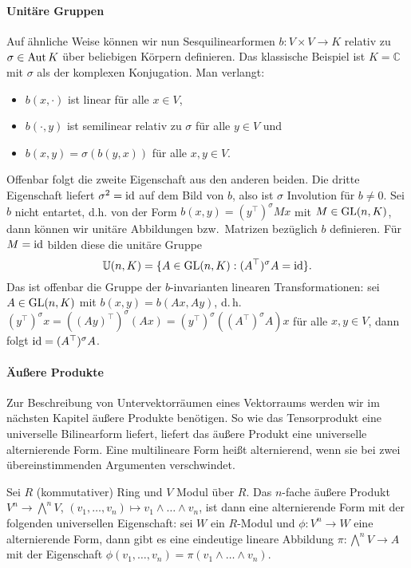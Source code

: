 \paragraph{Unitäre Gruppen} Auf ähnliche Weise können wir nun Sesquilinearformen $b: V \times V \to K$ relativ zu $\sigma \in \operatorname{Aut} K$ über beliebigen Körpern definieren. Das klassische Beispiel ist $K = \mathbb C$ mit $\sigma$ als der komplexen Konjugation. Man verlangt:
\begin{itemize}
\item $b(x, \cdot)$ ist linear für alle $x \in V$,
\item $b(\cdot, y)$ ist semilinear relativ zu $\sigma$ für alle $y \in V$ und
\item $b(x,y) = \sigma(b(y,x))$ für alle $x,y \in V$.
\end{itemize}
Offenbar folgt die zweite Eigenschaft aus den anderen beiden. Die dritte Eigenschaft liefert $\sigma^2 = \operatorname{id}$ auf dem Bild von $b$, also ist $\sigma$ Involution für $b \neq 0$. Sei $b$ nicht entartet, d.h. von der Form $b(x,y) = (y^\top)^\sigma M x$ mit $M \in \mathrm{GL}(n,K)$, dann können wir unitäre Abbildungen bzw.~Matrizen bezüglich $b$ definieren. Für $M = \operatorname{id}$ bilden diese die unitäre Gruppe
\begin{equation}
\mathbb U(n,K) = \{ A \in \mathrm{GL}(n,K): (A^\top)^\sigma A = \operatorname{id} \}.
\end{equation}
Das ist offenbar die Gruppe der $b$-invarianten linearen Transformationen: sei $A \in \mathrm{GL}(n,K)$ mit $b(x,y) = b(Ax,Ay)$, d.\,h. $(y^\top)^\sigma x = ((Ay)^\top)^\sigma (Ax) = (y^\top)^\sigma ((A^\top)^\sigma A) x$ für alle $x, y \in V$, dann folgt $\operatorname{id} = (A^\top)^\sigma A$.

\paragraph{Äußere Produkte} Zur Beschreibung von Untervektorräumen eines Vektorraums werden wir im nächsten Kapitel äußere Produkte benötigen. So wie das Tensorprodukt eine universelle Bilinearform liefert, liefert das äußere Produkt eine universelle alternierende Form. Eine multilineare Form heißt alternierend, wenn sie bei zwei übereinstimmenden Argumenten verschwindet.

\begin{defin}
Sei $R$ (kommutativer) Ring und $V$ Modul über $R$. Das $n$-fache äußere Produkt $V^n \to \bigwedge^n V$, $(v_1, \dots, v_n) \mapsto v_1 \wedge \dots \wedge v_n$, ist dann eine alternierende Form mit der folgenden universellen Eigenschaft: sei $W$ ein $R$-Modul und $\phi: V^n \to W$ eine alternierende Form, dann gibt es eine eindeutige lineare Abbildung $\pi: \bigwedge^n V \to A$ mit der Eigenschaft $\phi(v_1, \dots, v_n) = \pi(v_1 \wedge \dots \wedge v_n)$.
\end{defin}

